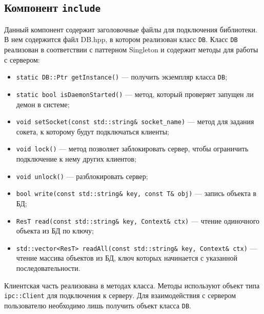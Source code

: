 \subsection{Компонент \texttt{include}}
Данный компонент содержит заголовочные файлы для подключения библиотеки. В нем содержится файл DB.hpp, в котором реализован класс \texttt{DB}. Класс \texttt{DB} реализован в соответствии с паттерном Singleton\cite{patterns} и содержит методы для работы с сервером:
\begin{itemize}
\item \texttt{static DB::Ptr getInstance()} --- получить экземпляр класса \texttt{DB};
\item \texttt{static bool isDaemonStarted()} --- метод, который проверяет запущен ли демон в системе;
\item \texttt{void setSocket(const std::string\& socket_name)} --- метод для задания сокета, к которому будут подключаться клиенты;
\item \texttt{void lock()} --- метод позволяет заблокировать сервер, чтобы ограничить подключение к нему других клиентов;
\item \texttt{void unlock()} --- разблокировать сервер;
\item \texttt{bool write(const std::string\& key, const T\& obj)} --- запись объекта в БД;
\item \texttt{ResT read(const std::string\& key, Context\& ctx)} --- чтение одиночного объекта из БД по ключу;
\item \texttt{std::vector<ResT> readAll(const std::string\& key, Context\& ctx)} --- чтение массива объектов из БД, ключ которых начинается с указанной последовательности.
\end{itemize}
Клиентская часть реализована в методах класса. Методы используют объект типа \texttt{ipc::Client} для подключения к серверу. Для взаимодействия с сервером пользователю необходимо лишь получить объект класса \texttt{DB}.


